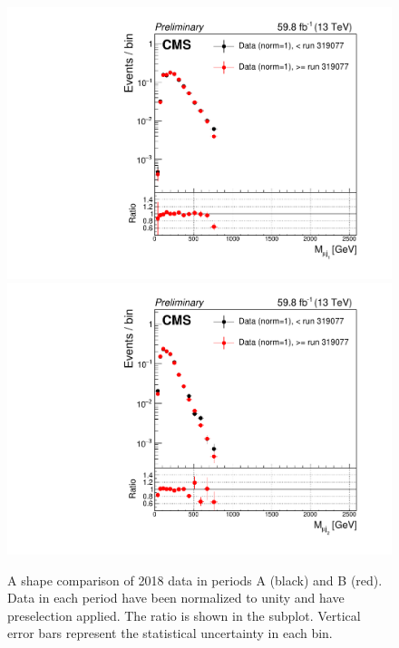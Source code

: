 \begin{figure}[H]
    \centering
    {\includegraphics[width=.49\textwidth]{Images/Analysis/Results_HEMFailureStudyPlots_Data_BeforeAfterRun319077/BasicLQ_uujj_M_uujj1_standard.pdf}}
    {\includegraphics[width=.49\textwidth]{Images/Analysis/Results_HEMFailureStudyPlots_Data_BeforeAfterRun319077/BasicLQ_uujj_M_uujj2_standard.pdf}}
    \caption{A shape comparison of 2018 data in periods A (black) and B (red). Data in each period have been normalized to unity and have preselection applied. The ratio \RatioDataAB is shown in the subplot. Vertical error bars represent the statistical uncertainty in each bin.}
    \label{figapp:hemLQcandidates}
\end{figure}

